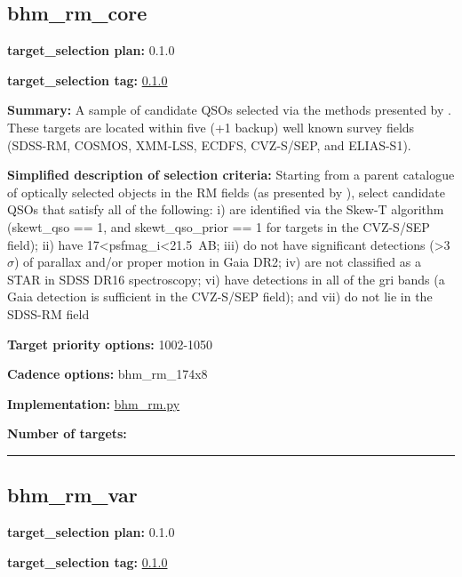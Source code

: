 \hypertarget{bhm_rm_core_plan0.1.0}{%
\subsection{bhm\_rm\_core}\label{bhm_rm_core_plan0.1.0}}

\noindent\textbf{target\_selection plan:} 0.1.0

\noindent\textbf{target\_selection tag:}
\href{https://github.com/sdss/target_selection/tree/0.1.0/}{0.1.0}

\noindent\textbf{Summary:} A sample of candidate QSOs selected via the methods
presented by
\citet{Yang2022}. These targets are located within five (+1 backup) well
known survey fields (SDSS-RM, COSMOS, XMM-LSS, ECDFS, CVZ-S/SEP, and
ELIAS-S1).

\noindent\textbf{Simplified description of selection criteria:} Starting from a
parent catalogue of optically selected objects in the RM fields (as
presented by
\citealt{Yang2022}), select candidate QSOs that satisfy all of the
following: i) are identified via the Skew-T algorithm (skewt\_qso == 1,
and skewt\_qso\_prior == 1 for targets in the CVZ-S/SEP field); ii) have
17\textless psfmag\_i\textless21.5~AB; iii) do not have significant
detections (\textgreater3$\sigma$) of parallax and/or proper motion in Gaia
DR2; iv) are not classified as a STAR in SDSS DR16 spectroscopy; vi)
have detections in all of the gri bands (a Gaia detection is sufficient
in the CVZ-S/SEP field); and vii) do not lie in the SDSS-RM field


\noindent\textbf{Target priority options:} 1002-1050

\noindent\textbf{Cadence options:} bhm\_rm\_174x8

\noindent\textbf{Implementation:}
\href{https://github.com/sdss/target_selection/blob/0.1.0/python/target_selection/cartons/bhm_rm.py}{bhm\_rm.py}

\noindent\textbf{Number of targets:}

\begin{center}\rule{0.5\linewidth}{0.5pt}\end{center}

\hypertarget{bhm_rm_var_plan0.1.0}{%
\subsection{bhm\_rm\_var}\label{bhm_rm_var_plan0.1.0}}

\noindent\textbf{target\_selection plan:} 0.1.0

\noindent\textbf{target\_selection tag:}
\href{https://github.com/sdss/target_selection/tree/0.1.0/}{0.1.0}

